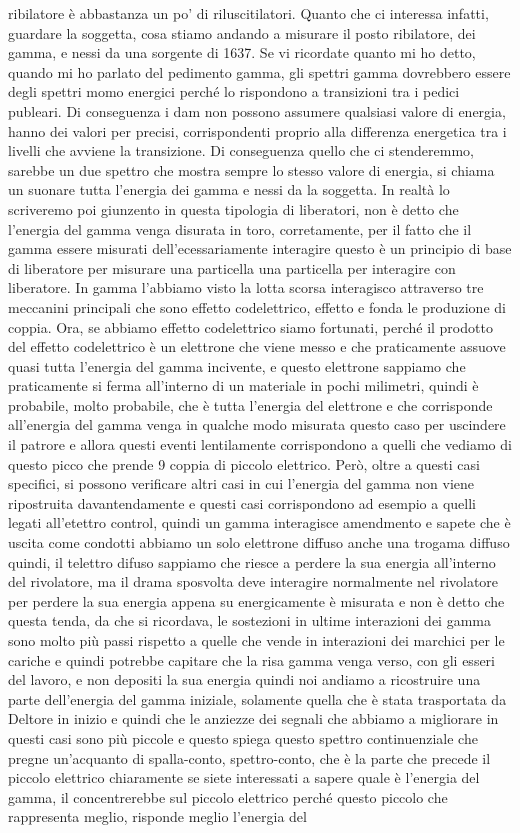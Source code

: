 ribilatore è abbastanza un po' di riluscitilatori. Quanto che ci interessa infatti, guardare la soggetta, cosa stiamo andando a misurare il posto ribilatore, dei gamma, e nessi da una sorgente di 1637. Se vi ricordate quanto mi ho detto, quando mi ho parlato del pedimento gamma, gli spettri gamma dovrebbero essere degli spettri momo energici perché lo rispondono a transizioni tra i pedici publeari. Di conseguenza i dam non possono assumere qualsiasi valore di energia, hanno dei valori per precisi, corrispondenti proprio alla differenza energetica tra i livelli che avviene la transizione. Di conseguenza quello che ci stenderemmo, sarebbe un due spettro che mostra sempre lo stesso valore di energia, si chiama un suonare tutta l'energia dei gamma e nessi da la soggetta. In realtà lo scriveremo poi giunzento in questa tipologia di liberatori, non è detto che l'energia del gamma venga disurata in toro, corretamente, per il fatto che il gamma essere misurati dell'ecessariamente interagire questo è un principio di base di liberatore per misurare una particella una particella per interagire con liberatore. In gamma l'abbiamo visto la lotta scorsa interagisco attraverso tre meccanini principali che sono effetto codelettrico, effetto e fonda le produzione di coppia. Ora, se abbiamo effetto codelettrico siamo fortunati, perché il prodotto del effetto codelettrico è un elettrone che viene messo e che praticamente assuove quasi tutta l'energia del gamma incivente, e questo elettrone sappiamo che praticamente si ferma all'interno di un materiale in pochi milimetri, quindi è probabile, molto probabile, che è tutta l'energia del elettrone e che corrisponde all'energia del gamma venga in qualche modo misurata questo caso per uscindere il patrore e allora questi eventi lentilamente corrispondono a quelli che vediamo di questo picco che prende 9 coppia di piccolo elettrico. Però, oltre a questi casi specifici, si possono verificare altri casi in cui l'energia del gamma non viene ripostruita davantendamente e questi casi corrispondono ad esempio a quelli legati all'etettro control, quindi un gamma interagisce amendmento e sapete che è uscita come condotti abbiamo un solo elettrone diffuso anche una trogama diffuso quindi, il telettro difuso sappiamo che riesce a perdere la sua energia all'interno del rivolatore, ma il drama sposvolta deve interagire normalmente nel rivolatore per perdere la sua energia appena su energicamente è misurata e non è detto che questa tenda, da che si ricordava, le sostezioni in ultime interazioni dei gamma sono molto più passi rispetto a quelle che vende in interazioni dei marchici per le cariche e quindi potrebbe capitare che la risa gamma venga verso, con gli esseri del lavoro, e non depositi la sua energia quindi noi andiamo a ricostruire una parte dell'energia del gamma iniziale, solamente quella che è stata trasportata da Deltore in inizio e quindi che le anziezze dei segnali che abbiamo a migliorare in questi casi sono più piccole e questo spiega questo spettro continuenziale che pregne un'acquanto di spalla-conto, spettro-conto, che è la parte che precede il piccolo elettrico chiaramente se siete interessati a sapere quale è l'energia del gamma, il concentrerebbe sul piccolo elettrico perché questo piccolo che rappresenta meglio, risponde meglio l'energia del 
